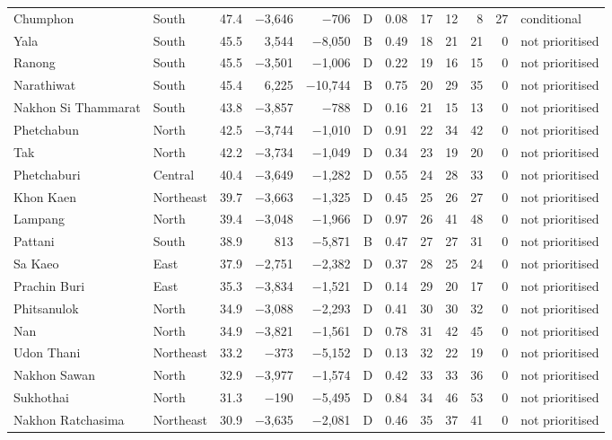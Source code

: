 \begin{longtable}{llrrrcrrrrrl}
Chumphon & South & 47.4 & $-$3,646 & $-$706 & D & 0.08 & 17 & 12 & 8 & 27 & conditional \\
Yala & South & 45.5 & 3,544 & $-$8,050 & B & 0.49 & 18 & 21 & 21 & 0 & not prioritised \\
Ranong & South & 45.5 & $-$3,501 & $-$1,006 & D & 0.22 & 19 & 16 & 15 & 0 & not prioritised \\
Narathiwat & South & 45.4 & 6,225 & $-$10,744 & B & 0.75 & 20 & 29 & 35 & 0 & not prioritised \\
Nakhon Si Thammarat & South & 43.8 & $-$3,857 & $-$788 & D & 0.16 & 21 & 15 & 13 & 0 & not prioritised \\
Phetchabun & North & 42.5 & $-$3,744 & $-$1,010 & D & 0.91 & 22 & 34 & 42 & 0 & not prioritised \\
Tak & North & 42.2 & $-$3,734 & $-$1,049 & D & 0.34 & 23 & 19 & 20 & 0 & not prioritised \\
Phetchaburi & Central & 40.4 & $-$3,649 & $-$1,282 & D & 0.55 & 24 & 28 & 33 & 0 & not prioritised \\
Khon Kaen & Northeast & 39.7 & $-$3,663 & $-$1,325 & D & 0.45 & 25 & 26 & 27 & 0 & not prioritised \\
Lampang & North & 39.4 & $-$3,048 & $-$1,966 & D & 0.97 & 26 & 41 & 48 & 0 & not prioritised \\
Pattani & South & 38.9 & 813 & $-$5,871 & B & 0.47 & 27 & 27 & 31 & 0 & not prioritised \\
Sa Kaeo & East & 37.9 & $-$2,751 & $-$2,382 & D & 0.37 & 28 & 25 & 24 & 0 & not prioritised \\
Prachin Buri & East & 35.3 & $-$3,834 & $-$1,521 & D & 0.14 & 29 & 20 & 17 & 0 & not prioritised \\
Phitsanulok & North & 34.9 & $-$3,088 & $-$2,293 & D & 0.41 & 30 & 30 & 32 & 0 & not prioritised \\
Nan & North & 34.9 & $-$3,821 & $-$1,561 & D & 0.78 & 31 & 42 & 45 & 0 & not prioritised \\
Udon Thani & Northeast & 33.2 & $-$373 & $-$5,152 & D & 0.13 & 32 & 22 & 19 & 0 & not prioritised \\
Nakhon Sawan & North & 32.9 & $-$3,977 & $-$1,574 & D & 0.42 & 33 & 33 & 36 & 0 & not prioritised \\
Sukhothai & North & 31.3 & $-$190 & $-$5,495 & D & 0.84 & 34 & 46 & 53 & 0 & not prioritised \\
Nakhon Ratchasima & Northeast & 30.9 & $-$3,635 & $-$2,081 & D & 0.46 & 35 & 37 & 41 & 0 & not prioritised \\

\end{longtable}
